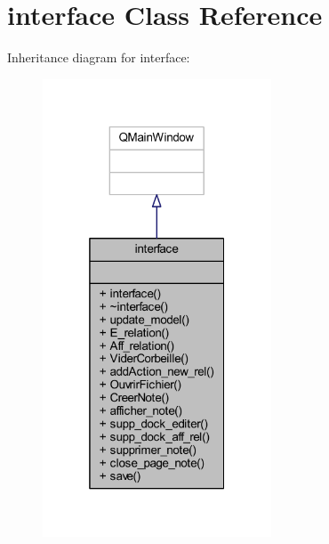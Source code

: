 \hypertarget{classinterface}{}\section{interface Class Reference}
\label{classinterface}


Inheritance diagram for interface\+:\nopagebreak
\begin{figure}[H]
\begin{center}
\leavevmode
\includegraphics[width=193pt]{classinterface__inherit__graph}
\end{center}
\end{figure}


